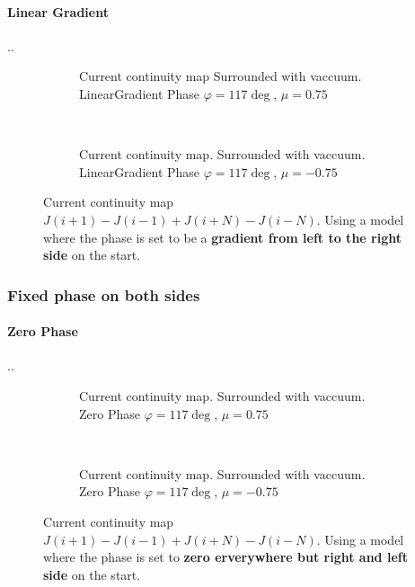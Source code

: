 \documentclass[../main.tex]{subfiles}
\begin{document}
\paragraph{Linear Gradient}..
\begin{figure}[H]
    \begin{subfigure}{0.4\textwidth}
        \centering
        \hspace{-4cm} %
        
        \caption{Current continuity map Surrounded with vaccuum. LinearGradient Phase $\varphi = 117\deg$, $\mu = 0.75$}
        \label{fig:first}
    \end{subfigure}    \\
    \begin{subfigure}{0.4\textwidth}
        \centering
        \hspace{-4cm} %
        
        \caption{Current continuity map. Surrounded with vaccuum. LinearGradient Phase $\varphi = 117\deg$, $\mu = -0.75$}
        \label{fig:first}
    \end{subfigure}    
    \caption{Current continuity map $J(i+1) - J(i-1) + J(i+N)- J(i-N)$. Using a model where the phase is set to be a \textbf{gradient from left to the right side} on the start.}
\end{figure}

\subsubsection{Fixed phase on both sides}
\paragraph{Zero Phase}..
\begin{figure}[H]
    \begin{subfigure}{0.4\textwidth}
        \centering
        \hspace{-4cm} %
        
        \caption{Current continuity map. Surrounded with vaccuum. Zero Phase $\varphi = 117\deg$, $\mu = 0.75$}
        \label{fig:first}
    \end{subfigure}    \\
    \begin{subfigure}{0.4\textwidth}
        \centering
        \hspace{-4cm} %
        
        \caption{Current continuity map. Surrounded with vaccuum. Zero Phase $\varphi = 117\deg$, $\mu = -0.75$}
        \label{fig:first}
    \end{subfigure}    
    \caption{ Current continuity map $J(i+1) - J(i-1) + J(i+N)- J(i-N)$. Using a model where the phase is set to \textbf{zero erverywhere but right and left side} on the start.}
\end{figure}
\end{document}
